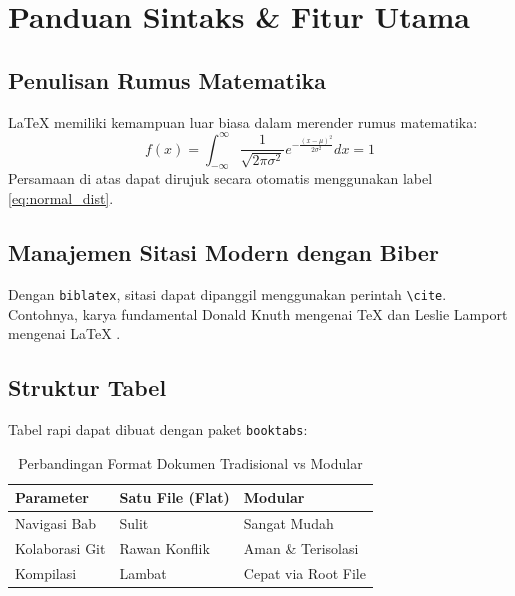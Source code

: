 \section{Panduan Sintaks \& Fitur Utama}
\label{sec:sintaks}

\subsection{Penulisan Rumus Matematika}
LaTeX memiliki kemampuan luar biasa dalam merender rumus matematika:
\begin{equation}
    f(x) = \int_{-\infty}^{\infty} \frac{1}{\sqrt{2\pi\sigma^2}} e^{-\frac{(x-\mu)^2}{2\sigma^2}} dx = 1
    \label{eq:normal_dist}
\end{equation}
Persamaan di atas dapat dirujuk secara otomatis menggunakan label \eqref{eq:normal_dist}.

\subsection{Manajemen Sitasi Modern dengan Biber}
Dengan \texttt{biblatex}, sitasi dapat dipanggil menggunakan perintah \texttt{\textbackslash cite}. Contohnya, karya fundamental Donald Knuth mengenai TeX \cite{knuth1984texbook} dan Leslie Lamport mengenai LaTeX \cite{lamport1994latex}.

\subsection{Struktur Tabel}
Tabel rapi dapat dibuat dengan paket \texttt{booktabs}:
\begin{table}[htbp]
\centering
\caption{Perbandingan Format Dokumen Tradisional vs Modular}
\label{tab:perbandingan}
\begin{tabular}{lll}
\toprule
\textbf{Parameter} & \textbf{Satu File (Flat)} & \textbf{Modular} \\
\midrule
Navigasi Bab & Sulit & Sangat Mudah \\
Kolaborasi Git & Rawan Konflik & Aman \& Terisolasi \\
Kompilasi & Lambat & Cepat via Root File \\
\bottomrule
\end{tabular}
\end{table}
